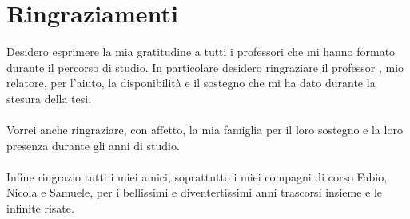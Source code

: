 \chapter*{Ringraziamenti}

Desidero esprimere la mia gratitudine a tutti i professori che mi hanno formato durante il percorso di studio. In particolare desidero ringraziare il professor \myProf, mio relatore, per l'aiuto, la disponibilità e il sostegno che mi ha dato durante la stesura della tesi. \\ \\
Vorrei anche ringraziare, con affetto, la mia famiglia per il loro sostegno e la loro presenza durante gli anni di studio. \\ \\
Infine ringrazio tutti i miei amici, soprattutto i miei compagni di corso Fabio, Nicola e Samuele, per i bellissimi e diventertissimi anni trascorsi insieme e le infinite risate. \\ \\
\noindent{\myLocation, \myTime}
\hfill \textit{\myName}

\newpage
